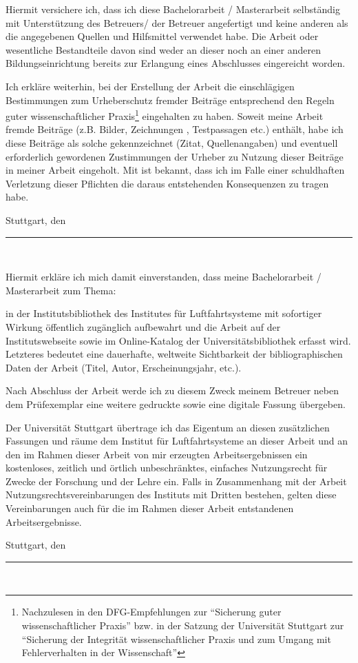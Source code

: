 
Hiermit versichere ich, dass ich diese Bachelorarbeit / Masterarbeit selbständig mit Unterstützung des Betreuers/ der Betreuer angefertigt und keine anderen als die angegebenen Quellen und Hilfsmittel verwendet habe. Die Arbeit oder wesentliche Bestandteile davon sind weder an dieser noch an einer anderen Bildungseinrichtung bereits zur Erlangung eines Abschlusses eingereicht worden.

Ich erkläre weiterhin, bei der Erstellung der Arbeit die einschlägigen Bestimmungen zum Urheberschutz fremder Beiträge entsprechend den Regeln guter wissenschaftlicher Praxis\footnote{Nachzulesen in den DFG-Empfehlungen zur "`Sicherung guter wissenschaftlicher Praxis"' bzw. in der Satzung der Universität Stuttgart zur "`Sicherung der Integrität wissenschaftlicher Praxis und zum Umgang mit Fehlerverhalten in der Wissenschaft"'} eingehalten zu haben. Soweit meine Arbeit fremde Beiträge (z.B. Bilder, Zeichnungen , Testpassagen etc.) enthält, habe ich diese Beiträge als solche gekennzeichnet (Zitat, Quellenangaben) und eventuell erforderlich gewordenen Zustimmungen der Urheber zu Nutzung dieser Beiträge in meiner Arbeit eingeholt. Mit ist bekannt, dass ich im Falle einer schuldhaften Verletzung dieser Pflichten die daraus entstehenden Konsequenzen zu tragen habe.

\vspace{2cm}

Stuttgart, den \thedate \hfill \rule{8cm}{0.4pt} \linebreak
\mbox{~} \hfill	\theauthor


Hiermit erkläre ich mich damit einverstanden, dass meine Bachelorarbeit / Masterarbeit zum Thema:
\begin{center}
	\textit{\thetitle}
\end{center}
in der Institutsbibliothek des Institutes für Luftfahrtsysteme mit sofortiger Wirkung öffentlich zugänglich aufbewahrt und die Arbeit auf der Institutswebseite sowie im Online-Katalog der Universitätsbibliothek erfasst wird. Letzteres bedeutet eine dauerhafte, weltweite Sichtbarkeit der bibliographischen Daten der Arbeit (Titel, Autor, Erscheinungsjahr, etc.).

Nach Abschluss der Arbeit werde ich zu diesem Zweck meinem Betreuer neben dem Prüfexemplar eine weitere gedruckte sowie eine digitale Fassung übergeben.

Der Universität Stuttgart übertrage ich das Eigentum an diesen zusätzlichen Fassungen und räume dem Institut für Luftfahrtsysteme an dieser Arbeit und an den im Rahmen dieser Arbeit von mir erzeugten Arbeitsergebnissen ein kostenloses, zeitlich und örtlich unbeschränktes, einfaches Nutzungsrecht für Zwecke der Forschung und der Lehre ein. Falls in Zusammenhang mit der Arbeit Nutzungsrechtsvereinbarungen des Instituts mit Dritten bestehen, gelten diese Vereinbarungen auch für die im Rahmen dieser Arbeit entstandenen Arbeitsergebnisse.

\vspace{2cm}

Stuttgart, den \thedate \hfill \rule{8cm}{0.4pt} \linebreak
\mbox{~} \hfill	\theauthor





